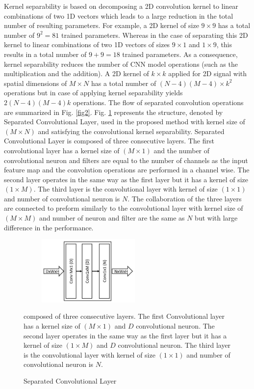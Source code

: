     
Kernel separability\cite{rigamonti2013learning} \cite{szegedy2017inception} is based on decomposing a 2D convolution kernel to linear combinations of two 1D vectors which leads to a large reduction in  the total number of resulting parameters. For example, a 2D kernel of size $9 \times 9$ has a total number of $9^2 = 81$  trained parameters. Whereas in the case of separating this 2D kernel to  linear combinations of two 1D vectors of sizes $9 \times 1$ and $1 \times 9$, this results in a total number of  $9 + 9 = 18$ trained parameters. As a consequence, kernel separability reduces the number of CNN model operations (such as the multiplication and the addition). A  2D kernel of $k \times k$ applied for 2D signal with spatial dimensions of $ M \times N$ has a total number of  $(N-4)(M-4)\times k^2$ operations but in case of  applying kernel separability  yields $2(N-4)(M-4)k$ operations. The flow of separated convolution operations are summarized in Fig. \ref{fig2}. Fig. \ref{fig3} represents the structure, denoted by Separated Convolutional Layer, used in the proposed method with kernel size of $(M\times N)$ and satisfying the convolutional kernel separability. Separated Convolutional Layer is composed of three consecutive layers. The first convolutional layer has a kernel size of $(M\times1)$ and the number of convolutional neuron and  filters are equal to the number of channels as the input feature map and the convolution operations are performed in a channel wise. The second layer  operates in the same way as the first layer but it has a kernel of size $(1\times M)$. The third layer is the convolutional layer with kernel of size $(1\times1)$ and number of convolutional neuron is $N$. The collaboration of the three layers are  connected to preform similarly to the convolutional layer with kernel size of $(M\times M)$ and number of neuron and filter are the same as $N$ but with large difference in the performance.


\begin{figure}
    \begin{center}
    \includegraphics[height=34mm,width=7.0cm]{Figures/fig3.jpg}
    \caption{Separated Convolutional Layer}{ composed of three consecutive layers. The first Convolutional layer has a kernel size of $(M\times1)$ and $D$  convolutional neuron. The second layer  operates in the same way as the first layer but it has a kernel of size $(1\times M)$ and $D$ convolutional neuron. The third layer is the convolutional layer with kernel of size $(1\times1)$ and number of convolutional neuron is $N$.}
    \label{fig3}
    \end{center}
    \end{figure}

